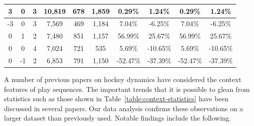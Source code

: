 \documentclass[]{article}
\begin{document}
\begin{table}[ht]
\begin{center}
{\begin{tabular}{|c|c|c|c|c|c|c|c|c|c|}
3 & 0 & 3 & 10,819 & 678 & 1,859 & 0.29\% & 1.24\% & 0.29\% & 1.24\% \\ \hline
-3 & 0 & 3 & 7,569 & 469 & 1,184 & 7.04\% & -6.25\% & 7.04\% & -6.25\% \\ \hline
0 & 1 & 2 & 7,480 & 851 & 1,157 & 56.99\% & 25.67\% & 56.99\% & 25.67\% \\ \hline
0 & 0 & 4 & 7,024 & 721 & 535 & 5.69\% & -10.65\% & 5.69\% & -10.65\% \\ \hline
0 & -1 & 2 & 6,853 & 791 & 1,150 & -52.47\% & -37.39\% & -52.47\% & -37.39\% \\ \hline
\end{tabular}
}
\end{center}
\end{table}

A number of previous papers on hockey dynamics have considered the context features of play sequences. The important trends that it is possible to glean from statistics such as those shown in Table~\ref{table:context-statistics} have been discussed in several papers. Our data analysis confirms these observations on a larger dataset than previously used. Notable findings include the following.


\end{document}
